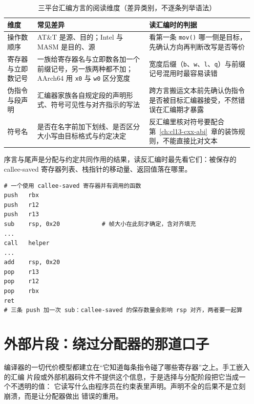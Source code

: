 \documentclass[12pt,a4paper,fontset=fandol]{ctexbook}
\newcommand{\Fn}[1]{\texttt{#1()}}
\newcommand{\Sym}[1]{\texttt{#1}}
\newcommand{\ArmSixtyFour}{\textsf{AArch64}}
\begin{document}
\begin{table}[H]
\centering
\begin{tabularx}{0.84\textwidth}{@{}>{\raggedright\arraybackslash}p{} >{\raggedright\arraybackslash}p{} X@{}}
\toprule
维度 & 常见差异 & 读汇编时的判据 \\
\midrule
操作数顺序 &
  AT\&T 是源、目的；Intel 与 MASM 是目的、源 &
  看第一条 \Fn{mov} 哪一侧是目标，先确认方向再判断改写是否等价 \\
寄存器与立即数记号 &
  一族给寄存器名与立即数各加一个前缀记号，另一族两种都不加；\ArmSixtyFour{} 用 \Sym{x0} 与 \Sym{w0} 区分宽度 &
  宽度后缀（\Sym{b}、\Sym{w}、\Sym{l}、\Sym{q}）与前缀记号混用时最容易读错 \\
伪指令与段声明 &
  汇编器家族各自规定段的声明形式、符号可见性与对齐指示的写法 &
  跨方言搬运文本前先确认伪指令是否被目标汇编器接受，不然错误在汇编期才暴露 \\
符号名 &
  是否在名字前加下划线、是否区分大小写由目标格式与约定决定 &
  反汇编里核对符号要配合第~\ref{ch:cl13-cxx-abi}~章的装饰规则，不能直接比对文本 \\
\bottomrule
\end{tabularx}
\caption{三平台汇编方言的阅读维度（差异类别，不逐条列举语法）}\label{tab:cl06-dialect}
\end{table}

序言与尾声是分配与约定共同作用的结果，读反汇编时最先看它们：被保存的
callee-saved 寄存器列表、栈指针的移动量、返回值落在哪里。

\begin{lstlisting}[style=outstyle, caption={反汇编里的序言与尾声（示意结构，非实测字节）}]
# 一个使用 callee-saved 寄存器并有调用的函数
push   rbx
push   r12
push   r13
sub    rsp, 0x20            # 帧大小在此刻才确定，含对齐填充
...
call   helper
...
add    rsp, 0x20
pop    r13
pop    r12
pop    rbx
ret
# 三条 push 加一次 sub：callee-saved 的保存数量会影响 rsp 对齐，两者要一起算
\end{lstlisting}

\section{外部片段：绕过分配器的那道口子}\label{sec:cl06-embedded}

编译器的一切代价模型都建立在“它知道每条指令碰了哪些寄存器”之上。手工嵌入的汇编
片段或外部机器码文件不提供这个信息，于是选择与分配阶段把它当成一个不透明的值：
它读写什么由程序员在约束表里声明。声明不全的后果不是立刻崩溃，而是让分配器做出
错误的重用。
\end{document}
